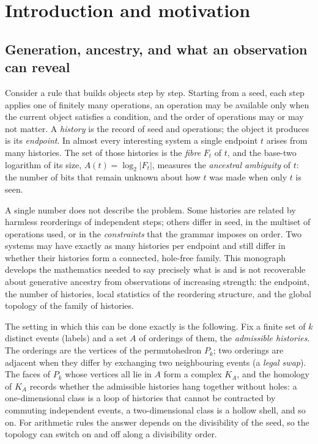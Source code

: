 \chapter{Introduction and motivation}\label{ch:intro}

\section{Generation, ancestry, and what an observation can reveal}
Consider a rule that builds objects step by step. Starting from a seed, each step applies one of finitely many operations, an operation may be available only when the current object satisfies a condition, and the order of operations may or may not matter. A \emph{history} is the record of seed and operations; the object it produces is its \emph{endpoint}. In almost every interesting system a single endpoint $t$ arises from many histories. The set of those histories is the \emph{fibre} $F_t$ of $t$, and the base-two logarithm of its size, $A(t)=\log_2|F_t|$, measures the \emph{ancestral ambiguity} of $t$: the number of bits that remain unknown about how $t$ was made when only $t$ is seen.

A single number does not describe the problem. Some histories are related by harmless reorderings of independent steps; others differ in seed, in the multiset of operations used, or in the \emph{constraints} that the grammar imposes on order. Two systems may have exactly as many histories per endpoint and still differ in whether their histories form a connected, hole-free family. This monograph develops the mathematics needed to say precisely what is and is not recoverable about generative ancestry from observations of increasing strength: the endpoint, the number of histories, local statistics of the reordering structure, and the global topology of the family of histories.

The setting in which this can be done exactly is the following. Fix a finite set of $k$ distinct events (labels) and a set $A$ of orderings of them, the \emph{admissible histories}. The orderings are the vertices of the permutohedron $P_k$; two orderings are adjacent when they differ by exchanging two neighbouring events (a \emph{legal swap}). The faces of $P_k$ whose vertices all lie in $A$ form a complex $K_A$, and the homology of $K_A$ records whether the admissible histories hang together without holes: a one-dimensional class is a loop of histories that cannot be contracted by commuting independent events, a two-dimensional class is a hollow shell, and so on. For arithmetic rules the answer depends on the divisibility of the seed, so the topology can switch on and off along a divisibility order.

